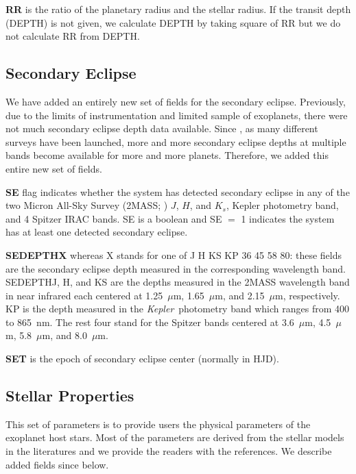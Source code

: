 \documentclass[11pt,preprint]{aastex}
\def\micron{$\mu$m}
\def\kepler{\textit{Kepler}}
\def\micron{$\mu$m}
\begin{document}
\begin{CJK*}{UTF8}{gbsn}
{\bf RR} is the ratio of the planetary radius and the stellar
radius. If the transit depth (DEPTH) is not given, we calculate DEPTH
by taking square of RR but we do not calculate RR from DEPTH.


\subsection{Secondary Eclipse}\label{sec:se}

We have added an entirely new set of fields for the secondary
eclipse. Previously, due to the limits of instrumentation and limited
sample of exoplanets, there were not much secondary eclipse depth data
available. Since \cite{Wright2011}, as many different surveys have
been launched, more and more secondary eclipse depths at multiple
bands become available for more and more planets. Therefore, we added
this entire new set of fields.

{\bf SE} flag indicates whether the system has detected secondary
eclipse in any of the two Micron All-Sky Survey (2MASS;
\citealt{Skrutskie2006}) $J$, $H$, and $K_s$, Kepler photometry band,
and 4 Spitzer IRAC bands. SE is a boolean and SE $=$ 1 indicates the
system has at least one detected secondary eclipse.

{\bf SEDEPTHX} whereas X stands for one of J H KS KP 36 45 58 80:
these fields are the secondary eclipse depth measured in the
corresponding wavelength band. SEDEPTHJ, H, and KS are the depths
measured in the 2MASS wavelength band in near infrared each centered
at 1.25~\micron, 1.65~\micron, and 2.15~\micron, respectively. KP is
the depth measured in the \kepler\ photometry band which ranges from
400 to 865~nm. The rest four stand for the Spitzer bands centered at
3.6~\micron, 4.5~\micron, 5.8~\micron, and 8.0~\micron.

{\bf SET} is the epoch of secondary eclipse center (normally in HJD).

\subsection{Stellar Properties}\label{sec:stellarprop}

This set of parameters is to provide users the physical parameters of
the exoplanet host stars.  Most of the parameters are derived from the
stellar models in the literatures and we provide the readers with the
references. We describe added fields since \cite{Wright2011} below.


\end{CJK*}
\end{document}
